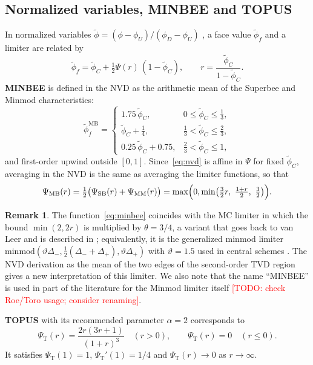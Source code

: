 \documentclass[11pt]{article}
\newcommand{\todo}[1]{\textcolor{red}{[TODO: #1]}}
\theoremstyle{plain}
\theoremstyle{definition}
\newtheorem{remark}[theorem]{Remark}
\begin{document}
\subsection{Normalized variables, MINBEE and TOPUS}
In normalized variables $\tilde\phi=(\phi-\phi_U)/(\phi_D-\phi_U)$ \cite{Leonard1988}, a face value $\tilde\phi_f$ and a limiter are related by
\begin{equation}\label{eq:nvd}
\tilde\phi_f=\tilde\phi_C+\tfrac12\Psi(r)\,(1-\tilde\phi_C),\qquad r=\frac{\tilde\phi_C}{1-\tilde\phi_C}.
\end{equation}
\textbf{MINBEE} is defined in the NVD as the arithmetic mean of the Superbee and Minmod characteristics:
\[
\tilde\phi_f^{\mathrm{MB}}=\begin{cases}1.75\,\tilde\phi_C,& 0\le\tilde\phi_C\le\frac13,\\ \tilde\phi_C+\frac14,&\frac13<\tilde\phi_C\le\frac23,\\ 0.25\,\tilde\phi_C+0.75,&\frac23<\tilde\phi_C\le1,\end{cases}
\]
and first-order upwind outside $[0,1]$. Since~\eqref{eq:nvd} is affine in $\Psi$ for fixed $\tilde\phi_C$, averaging in the NVD is the same as averaging the limiter functions, so that
\begin{equation}\label{eq:minbee}
\Psi_{\mathrm{MB}}(r)=\tfrac12\bigl(\Psi_{\mathrm{SB}}(r)+\Psi_{\mathrm{MM}}(r)\bigr)=\max\Bigl(0,\min\bigl(\tfrac32 r,\ \tfrac{1+r}{2},\ \tfrac32\bigr)\Bigr).
\end{equation}
\begin{remark}\label{rem:minbee}
The function~\eqref{eq:minbee} coincides with the MC limiter in which the bound $\min(2,2r)$ is multiplied by $\theta=3/4$, a variant that goes back to van Leer \cite{vanLeer1977} and is described in \cite[\S3.1.1]{Kemm2011}; equivalently, it is the generalized minmod limiter $\mathrm{minmod}(\vartheta\Delta_-,\frac12(\Delta_-+\Delta_+),\vartheta\Delta_+)$ with $\vartheta=1.5$ used in central schemes \cite{NessyahuTadmor1990,KurganovTadmor2000}. The NVD derivation as the mean of the two edges of the second-order TVD region gives a new interpretation of this limiter. We also note that the name ``MINBEE'' is used in part of the literature for the Minmod limiter itself \todo{check Roe/Toro usage; consider renaming}.
\end{remark}
\textbf{TOPUS} \cite{Ferreira2012} with its recommended parameter $\alpha=2$ corresponds to
\begin{equation}\label{eq:topus}
\Psi_{\mathrm T}(r)=\frac{2r(3r+1)}{(1+r)^3}\quad(r>0),\qquad \Psi_{\mathrm T}(r)=0\quad(r\le0).
\end{equation}
It satisfies $\Psi_{\mathrm T}(1)=1$, $\Psi_{\mathrm T}'(1)=1/4$ and $\Psi_{\mathrm T}(r)\to0$ as $r\to\infty$.
\end{document}
